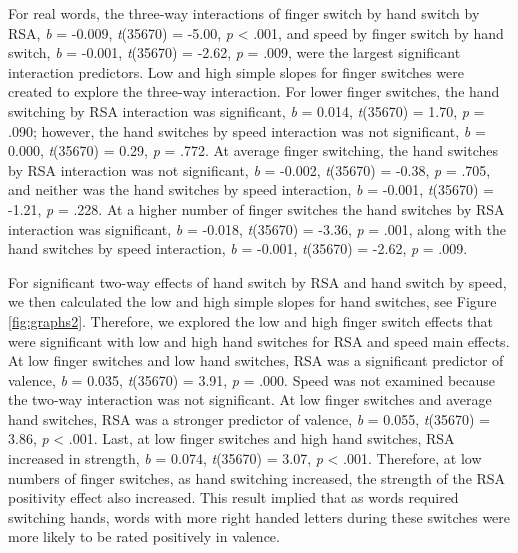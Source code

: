\documentclass[english,man,man,mask]{apa6}
\theoremstyle{definition}
\theoremstyle{definition}
\theoremstyle{definition}
\theoremstyle{remark}
\begin{document}
For real words, the three-way interactions of finger switch by hand
switch by RSA, \emph{b} = -0.009, \emph{t}(35670) = -5.00, \emph{p}
\textless{} .001, and speed by finger switch by hand switch, \emph{b} =
-0.001, \emph{t}(35670) = -2.62, \emph{p} = .009, were the largest
significant interaction predictors. Low and high simple slopes for
finger switches were created to explore the three-way interaction. For
lower finger switches, the hand switching by RSA interaction was
significant, \emph{b} = 0.014, \emph{t}(35670) = 1.70, \emph{p} = .090;
however, the hand switches by speed interaction was not significant,
\emph{b} = 0.000, \emph{t}(35670) = 0.29, \emph{p} = .772. At average
finger switching, the hand switches by RSA interaction was not
significant, \emph{b} = -0.002, \emph{t}(35670) = -0.38, \emph{p} =
.705, and neither was the hand switches by speed interaction, \emph{b} =
-0.001, \emph{t}(35670) = -1.21, \emph{p} = .228. At a higher number of
finger switches the hand switches by RSA interaction was significant,
\emph{b} = -0.018, \emph{t}(35670) = -3.36, \emph{p} = .001, along with
the hand switches by speed interaction, \emph{b} = -0.001,
\emph{t}(35670) = -2.62, \emph{p} = .009.

For significant two-way effects of hand switch by RSA and hand switch by
speed, we then calculated the low and high simple slopes for hand
switches, see Figure \ref{fig:graphs2}. Therefore, we explored the low
and high finger switch effects that were significant with low and high
hand switches for RSA and speed main effects. At low finger switches and
low hand switches, RSA was a significant predictor of valence, \emph{b}
= 0.035, \emph{t}(35670) = 3.91, \emph{p} = .000. Speed was not examined
because the two-way interaction was not significant. At low finger
switches and average hand switches, RSA was a stronger predictor of
valence, \emph{b} = 0.055, \emph{t}(35670) = 3.86, \emph{p} \textless{}
.001. Last, at low finger switches and high hand switches, RSA increased
in strength, \emph{b} = 0.074, \emph{t}(35670) = 3.07, \emph{p}
\textless{} .001. Therefore, at low numbers of finger switches, as hand
switching increased, the strength of the RSA positivity effect also
increased. This result implied that as words required switching hands,
words with more right handed letters during these switches were more
likely to be rated positively in valence.
\end{document}
